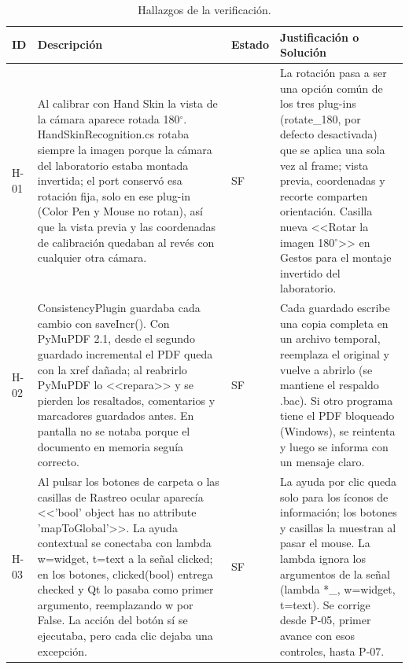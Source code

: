 \begin{table}[H]
\centering
\caption{Hallazgos de la verificación.}
\label{tab:hallazgos}
\begin{tabularx}{\textwidth}{l X l X}
\toprule
ID & Descripción & Estado & Justificación o Solución \\ \midrule
H-01 & Al calibrar con Hand Skin la vista de la cámara aparece rotada 180$^{\circ}$. HandSkinRecognition.cs rotaba siempre la imagen porque la cámara del laboratorio estaba montada invertida; el port conservó esa rotación fija, solo en ese plug-in (Color Pen y Mouse no rotan), así que la vista previa y las coordenadas de calibración quedaban al revés con cualquier otra cámara. & SF & La rotación pasa a ser una opción común de los tres plug-ins (rotate\_180, por defecto desactivada) que se aplica una sola vez al frame; vista previa, coordenadas y recorte comparten orientación. Casilla nueva <<Rotar la imagen 180$^{\circ}$>> en Gestos para el montaje invertido del laboratorio. \\ \midrule
H-02 & ConsistencyPlugin guardaba cada cambio con saveIncr(). Con PyMuPDF 2.1, desde el segundo guardado incremental el PDF queda con la xref dañada; al reabrirlo PyMuPDF lo <<repara>> y se pierden los resaltados, comentarios y marcadores guardados antes. En pantalla no se notaba porque el documento en memoria seguía correcto. & SF & Cada guardado escribe una copia completa en un archivo temporal, reemplaza el original y vuelve a abrirlo (se mantiene el respaldo .bac). Si otro programa tiene el PDF bloqueado (Windows), se reintenta y luego se informa con un mensaje claro. \\ \midrule
H-03 & Al pulsar los botones de carpeta o las casillas de Rastreo ocular aparecía <<'bool' object has no attribute 'mapToGlobal'>>. La ayuda contextual se conectaba con lambda w=widget, t=text a la señal clicked; en los botones, clicked(bool) entrega checked y Qt lo pasaba como primer argumento, reemplazando w por False. La acción del botón sí se ejecutaba, pero cada clic dejaba una excepción. & SF & La ayuda por clic queda solo para los íconos de información; los botones y casillas la muestran al pasar el mouse. La lambda ignora los argumentos de la señal (lambda *\_, w=widget, t=text). Se corrige desde P-05, primer avance con esos controles, hasta P-07. \\ \bottomrule
\end{tabularx}
\end{table}
